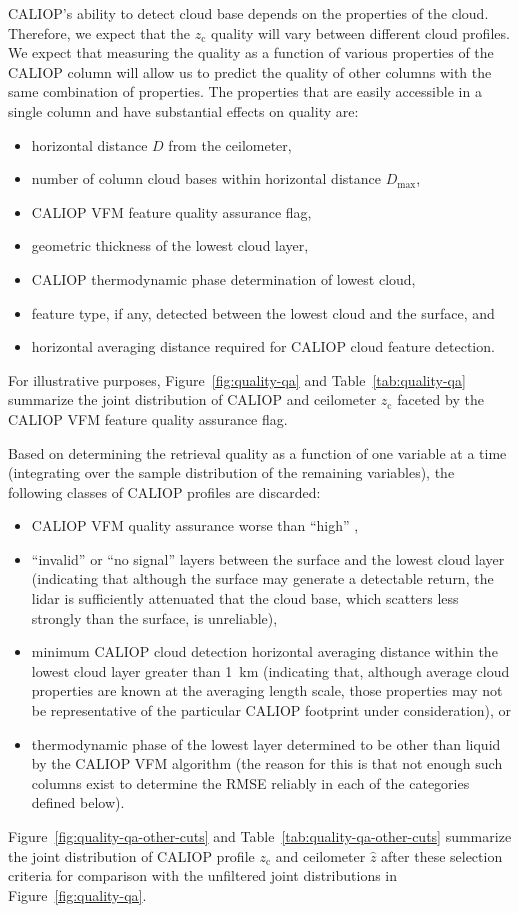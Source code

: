 \documentclass[essd,manuscript]{copernicus}
\begin{document}
CALIOP's ability to detect cloud base depends on the properties of the cloud.
Therefore, we expect that the \ensuremath{z_\text{c}}{} quality will vary between
different cloud profiles.  We expect that measuring the quality as a function of various
properties of the CALIOP column will allow us to predict the quality of other
columns with the same combination of properties.  The properties that are easily
accessible in a single column and have substantial effects on quality are:
\begin{itemize}
\item horizontal distance $D$ from the ceilometer,
\item number of column cloud bases within horizontal distance $D_\text{max}$,
\item CALIOP VFM feature quality assurance flag,
\item geometric thickness of the lowest cloud layer,
\item CALIOP thermodynamic phase determination of lowest cloud,
\item feature type, if any, detected between the lowest cloud and the surface, and
\item horizontal averaging distance required for CALIOP cloud feature
  detection.
\end{itemize}
For illustrative purposes, Figure~\ref{fig:quality-qa} and
Table~\ref{tab:quality-qa} summarize the joint distribution of CALIOP and
ceilometer \ensuremath{z_\text{c}}{} faceted by the CALIOP VFM feature quality assurance flag.

Based on determining the retrieval quality as a function of one variable at a
time (integrating over the sample distribution of the remaining variables), the
following classes of CALIOP profiles are discarded:
\begin{itemize}
\item CALIOP VFM quality assurance worse than ``high'' ,
\item ``invalid'' or ``no signal'' layers between the surface and the lowest
  cloud layer (indicating that although the surface may generate a detectable
  return, the lidar is sufficiently attenuated that the cloud base, which
  scatters less strongly than the surface, is unreliable),
\item minimum CALIOP cloud detection horizontal averaging distance within the
  lowest cloud layer greater than 1~km (indicating that, although average cloud
  properties are known at the averaging length scale, those properties may not
  be representative of the particular CALIOP footprint under consideration), or
\item thermodynamic phase of the lowest layer determined to be other than liquid
  by the CALIOP VFM algorithm (the reason for this is that not enough such
  columns exist to determine the RMSE reliably in each of the categories defined
  below).
\end{itemize}
Figure~\ref{fig:quality-qa-other-cuts} and Table~\ref{tab:quality-qa-other-cuts}
summarize the joint distribution of CALIOP profile \ensuremath{z_\text{c}}{} and ceilometer
$\hat{z}$ after these selection criteria for comparison with the unfiltered
joint distributions in Figure~\ref{fig:quality-qa}.
\end{document}
